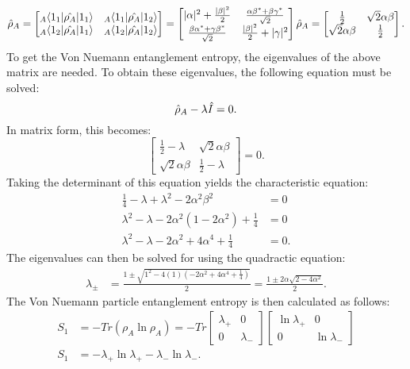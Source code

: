 \begin{equation}
\hat{\rho}_A = \begin{bmatrix} {}_A \langle 1_1 | \hat{\rho_A} | 1_1 \rangle & {}_A \langle 1_1 | \hat{\rho_A} | 1_2 \rangle \\ {}_A \langle 1_2 | \hat{\rho_A} | 1_1 \rangle & {}_A \langle 1_2 | \hat{\rho_A} | 1_2 \rangle \end{bmatrix} = \begin{bmatrix} |\alpha|^2 + \frac{|\beta|^2}{2} & \frac{\alpha \beta^* + \beta \gamma^*}{\sqrt{2}} \\ \frac{\beta \alpha^* + \gamma \beta^*}{\sqrt{2}} & \frac{|\beta|^2}{2} + |\gamma|^2 \end{bmatrix} \\
\hat{\rho}_A = \begin{bmatrix} \frac{1}{2} & \sqrt{2} \alpha \beta \\ \sqrt{2} \alpha \beta & \frac{1}{2} \end{bmatrix}.
\end{equation}
\noindent To get the Von Nuemann entanglement entropy, the eigenvalues of the above matrix are needed. To obtain these eigenvalues, the following equation must be solved:
\begin{equation}
\hat{\rho}_A - \lambda \hat{I} = 0. \\
\end{equation}
\noindent In matrix form, this becomes:
\begin{equation}
\begin{bmatrix} \frac{1}{2} - \lambda & \sqrt{2} \alpha \beta \\ \sqrt{2} \alpha \beta & \frac{1}{2} - \lambda \end{bmatrix} = 0.
\end{equation}
\noindent Taking the determinant of this equation yields the characteristic equation:
\begin{align}
\frac{1}{4} - \lambda + \lambda^2 -2 \alpha^2 \beta^2 &= 0 \\
\lambda^2 - \lambda - 2 \alpha^2 \left( 1 - 2 \alpha^2 \right) + \frac{1}{4} &= 0 \\
\lambda^2 - \lambda - 2 \alpha^2 + 4 \alpha^4 + \frac{1}{4} &= 0.
\end{align}
\noindent The eigenvalues can then be solved for using the quadractic equation:
\begin{align}
\lambda_{\pm} &= \frac{1 \pm \sqrt{1^2 - 4 \left( 1 \right) \left( -2 \alpha^2 + 4 \alpha^4 + \frac{1}{4} \right) }}{2} = \frac{1 \pm 2 \alpha \sqrt{2 - 4 \alpha^2}}{2}.
\end{align}
\noindent The Von Nuemann particle entanglement entropy is then calculated as follows:
\begin{align}
S_1 &= -Tr \left( \rho_A \ln{\rho_A} \right) = -Tr \begin{bmatrix} \lambda_+ & 0 \\ 0 & \lambda_- \end{bmatrix} \begin{bmatrix} \ln{\lambda_+} & 0 \\ 0 & \ln{\lambda_-} \end{bmatrix} \\
S_1 &= -\lambda_+ \ln{\lambda_+} - \lambda_- \ln{\lambda_-}.
\end{align}
